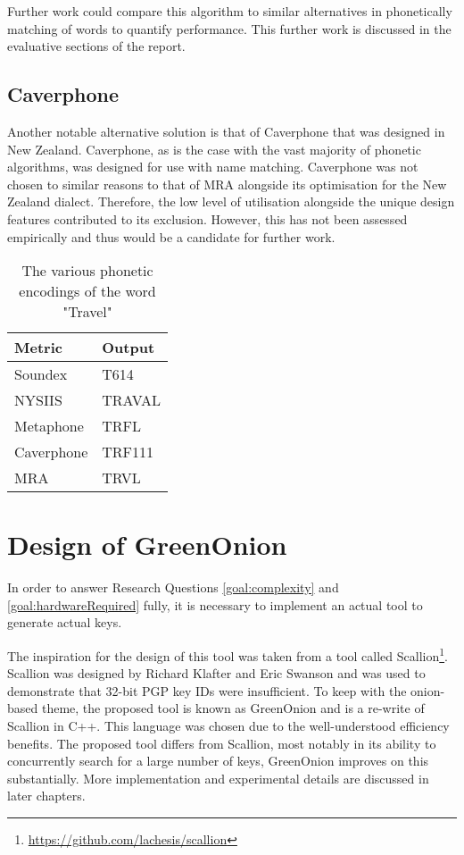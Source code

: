 Further work could compare this algorithm to similar alternatives in phonetically matching of words to quantify performance. This further work is discussed in the evaluative sections of the report.

\subsection{Caverphone}
Another notable alternative solution is that of Caverphone that was designed in New Zealand. Caverphone, as is the case with the vast majority of phonetic algorithms, was designed for use with name matching. Caverphone was not chosen to similar reasons to that of MRA alongside its optimisation for the New Zealand dialect. Therefore, the low level of utilisation alongside the unique design features contributed to its exclusion. However, this has not been assessed empirically and thus would be a candidate for further work.

\begin{table}[h!]
    \centering
    \begin{tabular}{ll}
        Metric & Output \\
        \hline    
        Soundex & T614 \\
        NYSIIS & TRAVAL\\
        Metaphone & TRFL\\
        Caverphone & TRF111\\
        MRA & TRVL
    \end{tabular}
    \caption{The various phonetic encodings of the word "Travel"}
\end{table}

\section{Design of GreenOnion}
\label{sec:greenDesign}
In order to answer Research Questions \ref{goal:complexity} and \ref{goal:hardwareRequired} fully, it is necessary to implement an actual tool to generate actual keys. 

The inspiration for the design of this tool was taken from a tool called Scallion\footnote{\url{https://github.com/lachesis/scallion}}. Scallion was designed by Richard Klafter and Eric Swanson and was used to demonstrate that 32-bit PGP key IDs were insufficient. To keep with the onion-based theme, the proposed tool is known as GreenOnion and is a re-write of Scallion in C++. This language was chosen due to the well-understood efficiency benefits. The proposed tool differs from Scallion, most notably in its ability to concurrently search for a large number of keys, GreenOnion improves on this substantially. More implementation and experimental details are discussed in later chapters.

